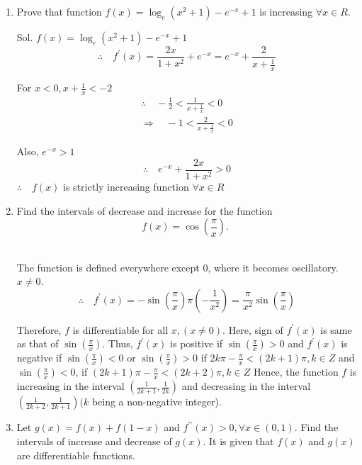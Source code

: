 \begin{enumerate}
    \item Prove that function $f(x)=\log _e\left(x^2+1\right)-e^{-x}+1$ is increasing $\forall x \in R$.\\
\begin{outline}
    Sol. $f(x)=\log _e\left(x^2+1\right)-e^{-x}+1$
$$
\therefore \quad f^{\prime}(x)=\frac{2 x}{1+x^2}+e^{-x}=e^{-x}+\frac{2}{x+\frac{1}{x}}
$$

For $x<0, x+\frac{1}{x}<-2$
$$
\begin{gathered}
\therefore \quad-\frac{1}{2}<\frac{1}{x+\frac{1}{x}}<0 \\
\Rightarrow \quad-1<\frac{2}{x+\frac{1}{x}}<0
\end{gathered}
$$

Also, $e^{-x}>1$
$$
\therefore \quad e^{-x}+\frac{2 x}{1+x^2}>0
$$
$\therefore \quad f(x)$ is strictly increasing function $\forall x \in R$
\end{outline}

\item Find the intervals of decrease and increase for the function
$$
f(x)=\cos \left(\frac{\pi}{x}\right) \text {. }
$$\\

\begin{outline}
The function is defined everywhere except 0, where it becomes oscillatory.
    $x \neq 0$.
$$
\therefore \quad f^{\prime}(x)=-\sin \left(\frac{\pi}{x}\right) \pi\left(-\frac{1}{x^2}\right)=\frac{\pi}{x^2} \sin \left(\frac{\pi}{x}\right)
$$

Therefore, $f$ is differentiable for all $x,(x \neq 0)$.
Here, sign of $f^{\prime}(x)$ is same as that of $\sin \left(\frac{\pi}{x}\right)$.
Thus, $f^{\prime}(x)$ is positive if $\sin \left(\frac{\pi}{x}\right)>0$ and $f^{\prime}(x)$ is negative if $\sin \left(\frac{\pi}{x}\right)<0$
or $\sin \left(\frac{\pi}{x}\right)>0$ if $2 k \pi-\frac{\pi}{x}<(2 k+1) \pi, k \in Z$
and $\sin \left(\frac{\pi}{x}\right)<0$, if $(2 k+1) \pi-\frac{\pi}{x}<(2 k+2) \pi, k \in Z$
Hence, the function $f$ is increasing in the interval $\left(\frac{1}{2 k+1}, \frac{1}{2 k}\right)$ and decreasing in the interval $\left(\frac{1}{2 k+2}, \frac{1}{2 k+1}\right)(k$ being a non-negative integer).

\end{outline}

\item Let $g(x)=f(x)+f(1-x)$ and $f^{\prime \prime}(x)>0, \forall x \in(0,1)$. Find the intervals of increase and decrease of $g(x)$. It is given that $f(x)$ and $g(x)$ are differentiable functions.\\\\


\end{enumerate}
